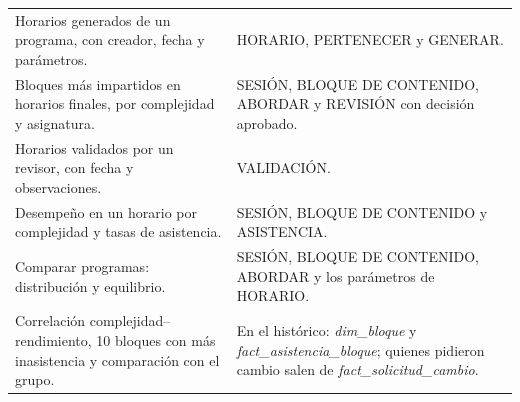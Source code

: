 {\small\filas
\begin{xltabular}{\linewidth}{L{0.85}L{1.15}}
 &  \\
\endhead
Horarios generados de un programa, con creador, fecha y parámetros. & HORARIO, PERTENECER y GENERAR. \\
Bloques más impartidos en horarios finales, por complejidad y asignatura. & SESIÓN, BLOQUE DE CONTENIDO, ABORDAR y REVISIÓN con decisión aprobado. \\
Horarios validados por un revisor, con fecha y observaciones. & VALIDACIÓN. \\
Desempeño en un horario por complejidad y tasas de asistencia. & SESIÓN, BLOQUE DE CONTENIDO y ASISTENCIA. \\
Comparar programas: distribución y equilibrio. & SESIÓN, BLOQUE DE CONTENIDO, ABORDAR y los parámetros de HORARIO. \\
Correlación complejidad–rendimiento, 10 bloques con más inasistencia y comparación con el grupo. & En el histórico: \emph{dim\_bloque} y \emph{fact\_asistencia\_bloque}; quienes pidieron cambio salen de \emph{fact\_solicitud\_cambio}. \\
\end{xltabular}}
